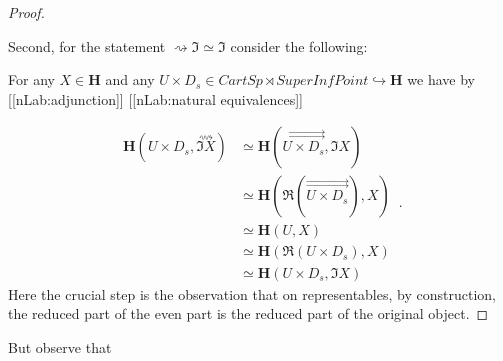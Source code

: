 \documentclass[12pt,titlepage]{article}
\theoremstyle{plain}
\theoremstyle{definition}
\theoremstyle{remark}
\begin{document}
\begin{proof}
$\,$

Second, for the statement $\rightsquigarrow \Im \simeq \Im$ consider the following:

For any $X \in \mathbf{H}$ and any $U \times D_s\in CartSp \rtimes SuperInfPoint \hookrightarrow \mathbf{H}$ we have by [[nLab:adjunction]] [[nLab:natural equivalences]]

\begin{displaymath}
\begin{aligned}
    \mathbf{H}(U \times D_s , \stackrel{\rightsquigarrow}{\Im X})
    & \simeq
    \mathbf{H}(\stackrel{\rightrightarrows}{U \times D_s} , \Im X)
    \\
    &\simeq
    \mathbf{H}(\Re(\stackrel{\rightrightarrows}{U \times D_s}) , X)
    \\
    & \simeq
    \mathbf{H}(U, X)
    \\
    & \simeq
    \mathbf{H}(\Re(U \times D_s), X)
    \\
    & \simeq \mathbf{H}(U \times D_s, \Im X)
  \end{aligned}
  \,.
\end{displaymath}
Here the crucial step is the observation that on representables, by construction, the reduced part of the even part is the reduced part of the original object.

\end{proof}
But observe that
\end{document}
